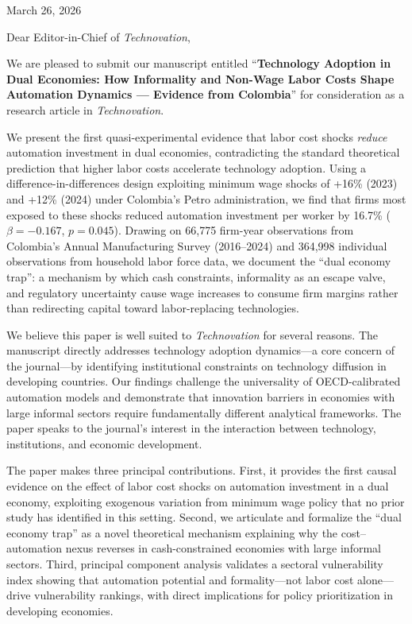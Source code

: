 \documentclass[12pt]{article}
\begin{document}
\begin{flushright}
March 26, 2026
\end{flushright}

\vspace{0.5cm}

Dear Editor-in-Chief of \textit{Technovation},

\vspace{0.3cm}

We are pleased to submit our manuscript entitled ``\textbf{Technology Adoption in Dual Economies: How Informality and Non-Wage Labor Costs Shape Automation Dynamics --- Evidence from Colombia}'' for consideration as a research article in \textit{Technovation}.

We present the first quasi-experimental evidence that labor cost shocks \emph{reduce} automation investment in dual economies, contradicting the standard theoretical prediction that higher labor costs accelerate technology adoption. Using a difference-in-differences design exploiting minimum wage shocks of +16\% (2023) and +12\% (2024) under Colombia's Petro administration, we find that firms most exposed to these shocks reduced automation investment per worker by 16.7\% ($\beta = -0.167$, $p = 0.045$). Drawing on 66,775 firm-year observations from Colombia's Annual Manufacturing Survey (2016--2024) and 364,998 individual observations from household labor force data, we document the ``dual economy trap'': a mechanism by which cash constraints, informality as an escape valve, and regulatory uncertainty cause wage increases to consume firm margins rather than redirecting capital toward labor-replacing technologies.

We believe this paper is well suited to \textit{Technovation} for several reasons. The manuscript directly addresses technology adoption dynamics---a core concern of the journal---by identifying institutional constraints on technology diffusion in developing countries. Our findings challenge the universality of OECD-calibrated automation models and demonstrate that innovation barriers in economies with large informal sectors require fundamentally different analytical frameworks. The paper speaks to the journal's interest in the interaction between technology, institutions, and economic development.

The paper makes three principal contributions. First, it provides the first causal evidence on the effect of labor cost shocks on automation investment in a dual economy, exploiting exogenous variation from minimum wage policy that no prior study has identified in this setting. Second, we articulate and formalize the ``dual economy trap'' as a novel theoretical mechanism explaining why the cost--automation nexus reverses in cash-constrained economies with large informal sectors. Third, principal component analysis validates a sectoral vulnerability index showing that automation potential and formality---not labor cost alone---drive vulnerability rankings, with direct implications for policy prioritization in developing economies.
\end{document}
